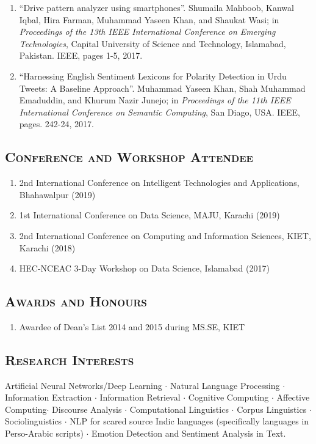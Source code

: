 \documentclass[a4paper, 10pt]{article}
\begin{document}
\begin{enumerate}
  \item ``Drive pattern analyzer using smartphones''. Shumaila Mahboob, Kanwal Iqbal, Hira Farman, Muhammad Yaseen Khan, and Shaukat Wasi; in \emph{ Proceedings of the 13th IEEE International Conference on Emerging Technologies}, Capital University of Science and Technology, Islamabad, Pakistan. IEEE, pages 1-5, 2017.
  
  \item ``Harnessing English Sentiment Lexicons for Polarity Detection in Urdu Tweets: A Baseline Approach''. Muhammad Yaseen Khan, Shah Muhammad Emaduddin, and Khurum Nazir Junejo;  in \emph{Proceedings of the 11th IEEE International Conference on Semantic Computing}, San Diago, USA. IEEE, pages. 242-24, 2017.
\end{enumerate}

\subsection*{\normalfont\textsc{\bf Conference and Workshop Attendee}}
\begin{enumerate}
\itemsep-4pt
\item 2nd International Conference on Intelligent Technologies and Applications, Bhahawalpur (2019)
\item 1st International Conference on Data Science, MAJU, Karachi (2019)
\item 2nd International Conference on Computing and Information Sciences, KIET, Karachi (2018)
\item HEC-NCEAC 3-Day Workshop on Data Science, Islamabad (2017) 
\end{enumerate}

\subsection*{\normalfont\textsc{\bf Awards and Honours}}
\begin{enumerate}
\itemsep-4pt 
 \item Awardee of Dean's List 2014 and 2015 during MS.SE, KIET
\end{enumerate}

\subsection*{\normalfont\textsc{\bf Research Interests}}
Artificial Neural Networks/Deep Learning $\cdot$ Natural Language Processing $\cdot$ Information Extraction $\cdot$ Information Retrieval $\cdot$ Cognitive Computing $\cdot$ Affective Computing$\cdot$ Discourse Analysis $\cdot$ Computational Linguistics $\cdot$ Corpus Linguistics $\cdot$ Sociolinguistics $\cdot$ NLP for scared source Indic languages (specifically languages in Perso-Arabic scripts) $\cdot$ Emotion Detection and Sentiment Analysis in Text.
\end{document}
